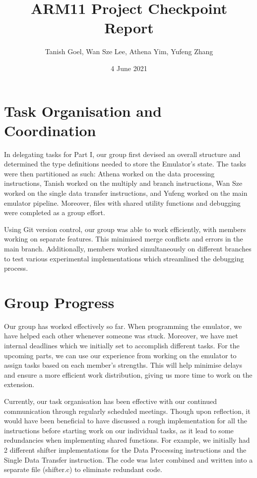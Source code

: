 \documentclass[letterpaper,11pt]{article}
\begin{document}
\title{ARM11 Project Checkpoint Report}
\author{Tanish Goel, Wan Sze Lee, Athena Yim, Yufeng Zhang}
\date{4 June 2021}
\maketitle


\section{Task Organisation and Coordination}

In delegating tasks for Part I, our group first devised an overall structure and determined the type definitions needed to store the Emulator's state. The tasks were then partitioned as such:  Athena worked on the data processing instructions, Tanish worked on the multiply and branch instructions, Wan Sze worked on the single data transfer instructions, and Yufeng worked on the main emulator pipeline. Moreover, files with shared utility functions and debugging were completed as a group effort.

\vspace{\baselineskip}

\noindent Using Git version control, our group was able to work efficiently, with members working on separate features. This minimised merge conflicts and errors in the main branch. Additionally, members worked simultaneously on different branches to test various experimental implementations which streamlined the debugging process.


\section{Group Progress}

Our group has worked effectively so far. When programming the emulator, we have helped each other whenever someone was stuck. Moreover, we have met internal deadlines which we initially set to accomplish different tasks. For the upcoming parts, we can use our experience from working on the emulator to assign tasks based on each member's strengths. This will help minimise delays and ensure a more efficient work distribution, giving us more time to work on the extension.

\vspace{\baselineskip}

\noindent Currently, our task organisation has been effective with our continued communication through regularly scheduled meetings. Though upon reflection, it would have been beneficial to have discussed a rough implementation for all the instructions before starting work on our individual tasks, as it lead to some redundancies when implementing shared functions. For example, we initially had 2 different shifter implementations for the Data Processing instructions and the Single Data Transfer instruction. The code was later combined and written into a separate file (shifter.c) to eliminate redundant code. 
\vspace{\baselineskip}
\end{document}

